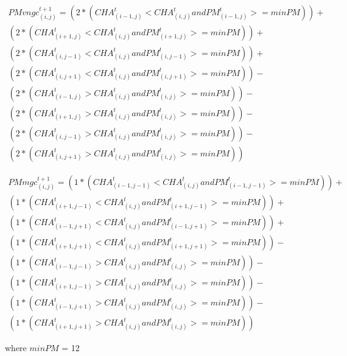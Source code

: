 \begin{equation}
\begin{split}
PMvngc^{t+1}_{(i, j)} = 
(2* (CHA^t_{(i-1, j)} < CHA^t_{(i, j)} and PM^t_{(i-1, j)} >= minPM)) +
\\(2* (CHA^t_{(i+1, j)} < CHA^t_{(i, j)} and PM^t_{(i+1, j)} >= minPM)) + 
\\(2* (CHA^t_{(i, j-1)} < CHA^t_{(i, j)} and PM^t_{(i, j-1)} >= minPM)) +
\\(2* (CHA^t_{(i, j+1)} < CHA^t_{(i, j)} and PM^t_{(i, j+1)} >= minPM)) -
\\(2*(CHA^t_{(i-1, j)} > CHA^t_{(i, j)} and PM^t_{(i, j)} >= minPM)) -
\\(2*(CHA^t_{(i+1, j)} > CHA^t_{(i, j)} and PM^t_{(i, j)} >= minPM)) -
\\(2*(CHA^t_{(i, j-1)} > CHA^t_{(i, j)} and PM^t_{(i, j)} >= minPM)) -
\\(2*(CHA^t_{(i, j+1)} > CHA^t_{(i, j)} and PM^t_{(i, j)} >= minPM))
\end{split}
\end{equation}

\begin{equation}
\begin{split}
PMmgc^{t+1}_{(i, j)}= 
(1* (CHA^t_{(i-1, j-1)} < CHA^t_{(i, j)} and PM^t_{(i-1, j-1)}>= minPM)) +
\\(1* (CHA^t_{(i+1, j-1)} < CHA^t_{(i, j)} and PM^t_{(i+1, j-1)} >= minPM)) + 
\\(1* (CHA^t_{(i-1, j+1)} < CHA^t_{(i, j)} and PM^t_{(i-1, j+1)} >= minPM)) +
\\(1* (CHA^t_{(i+1, j+1)}  < CHA^t_{(i, j)} and PM^t_{(i+1, j+1)} >= minPM)) - 
\\(1*(CHA^t_{(i-1, j-1)} > CHA^t_{(i, j)} and PM^t_{(i, j)} >= minPM)) -
\\(1*(CHA^t_{(i+1, j-1)} > CHA^t_{(i, j)} and PM^t_{(i, j)} >= minPM)) -
\\(1*(CHA^t_{(i-1, j+1)} > CHA^t_{(i, j)} and PM^t_{(i, j)} >= minPM)) -
\\(1*(CHA^t_{(i+1, j+1)} > CHA^t_{(i, j)} and PM^t_{(i, j)} >= minPM))
\end{split}
\end{equation}

where $minPM$ = 12
